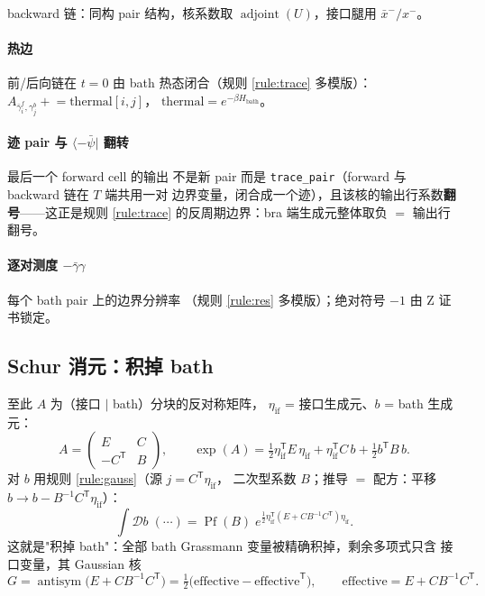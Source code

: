 \documentclass[11pt,a4paper]{ctexart}
\newcommand{\Pf}{\operatorname{Pf}}
\newcommand{\antisym}{\operatorname{antisym}}
\theoremstyle{plain}
\theoremstyle{definition}
\theoremstyle{remark}
\begin{document}
backward 链：同构 pair 结构，核系数取 $\operatorname{adjoint}(U)$，接口腿用
$\bar x^-/x^-$。

\paragraph{热边} 前/后向链在 $t{=}0$ 由 bath 热态闭合（规则 \ref{rule:trace} 多模版）：
$A_{\bar\gamma^f_i, \gamma^b_j} \mathrel{+}= \mathrm{thermal}[i,j]$，
$\mathrm{thermal} = e^{-\beta H_{\mathrm{bath}}}$。

\paragraph{迹 pair 与 $\langle-\bar\psi|$ 翻转} 最后一个 forward cell 的输出
不是新 pair 而是 \texttt{trace\_pair}（forward 与 backward 链在 $T$ 端共用一对
边界变量，闭合成一个迹），且该核的输出行系数\textbf{翻号}——这正是规则
\ref{rule:trace} 的反周期边界：bra 端生成元整体取负 $=$ 输出行翻号。

\paragraph{逐对测度 $-\bar\gamma\gamma$} 每个 bath pair 上的边界分辨率
（规则 \ref{rule:res} 多模版）；绝对符号 $-1$ 由 Z 证书锁定。

\subsection{Schur 消元：积掉 bath}

至此 $A$ 为（接口 $|$ bath）分块的反对称矩阵，
$\eta_{\mathrm{if}}$ = 接口生成元、$b$ = bath 生成元：
\begin{equation}
A = \begin{pmatrix} E & C \\ -C^{\mathsf T} & B \end{pmatrix},
\qquad
\exp(A) = \tfrac12 \eta_{\mathrm{if}}^{\mathsf T} E\, \eta_{\mathrm{if}}
+ \eta_{\mathrm{if}}^{\mathsf T} C\, b + \tfrac12 b^{\mathsf T} B\, b .
\end{equation}
对 $b$ 用规则 \ref{rule:gauss}（源 $j = C^{\mathsf T}\eta_{\mathrm{if}}$，
二次型系数 $B$；推导 $=$ 配方：平移 $b \to b - B^{-1}C^{\mathsf T}\eta_{\mathrm{if}}$）：
\begin{equation}
\int \mathcal{D}b\;(\cdots) = \Pf(B)\;
e^{\frac12 \eta_{\mathrm{if}}^{\mathsf T}(E + C B^{-1} C^{\mathsf T})\eta_{\mathrm{if}}}.
\label{eq:schur}
\end{equation}
这就是"积掉 bath"：全部 bath Grassmann 变量被精确积掉，剩余多项式只含
接口变量，其 Gaussian 核
\begin{equation}
G = \antisym\!\big(E + C B^{-1} C^{\mathsf T}\big)
= \tfrac12\big(\text{effective} - \text{effective}^{\mathsf T}\big),
\qquad \text{effective} = E + C B^{-1} C^{\mathsf T}.
\label{eq:G}
\end{equation}
\end{document}
